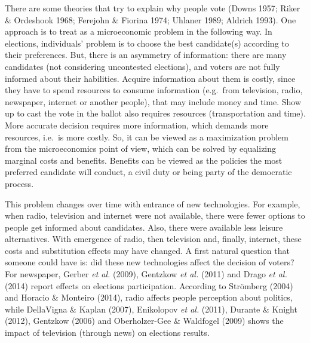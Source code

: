 \documentclass[12pt,]{article}
\begin{document}
There are some theories that try to explain why people vote (Downs 1957;
Riker \& Ordeshook 1968; Ferejohn \& Fiorina 1974; Uhlaner 1989; Aldrich
1993). One approach is to treat as a microeconomic problem in the
following way. In elections, individuals' problem is to choose the best
candidate(s) according to their preferences. But, there is an asymmetry
of information: there are many candidates (not considering uncontested
elections), and voters are not fully informed about their habilities.
Acquire information about them is costly, since they have to spend
resources to consume information (e.g.~from television, radio,
newspaper, internet or another people), that may include money and time.
Show up to cast the vote in the ballot also requires resources
(transportation and time). More accurate decision requires more
information, which demands more resources, i.e.~is more costly. So, it
can be viewed as a maximization problem from the microeconomics point of
view, which can be solved by equalizing marginal costs and benefits.
Benefits can be viewed as the policies the most preferred candidate will
conduct, a civil duty or being party of the democratic process.

This problem changes over time with entrance of new technologies. For
example, when radio, television and internet were not available, there
were fewer options to people get informed about candidates. Also, there
were available less leisure alternatives. With emergence of radio, then
television and, finally, internet, these costs and substitution effects
may have changed. A first natural question that someone could have is:
did these new technologies affect the decision of voters? For newspaper,
Gerber \emph{et al.} (2009), Gentzkow \emph{et al.} (2011) and Drago
\emph{et al.} (2014) report effects on elections participation.
According to Strömberg (2004) and Horacio \& Monteiro (2014), radio
affects people perception about politics, while DellaVigna \& Kaplan
(2007), Enikolopov \emph{et al.} (2011), Durante \& Knight (2012),
Gentzkow (2006) and Oberholzer-Gee \& Waldfogel (2009) shows the impact
of television (through news) on elections results.
\end{document}

